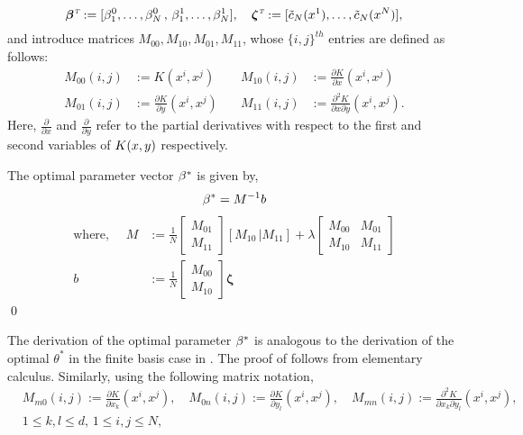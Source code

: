 \[
\boldsymbol{\beta}^{\hbox{\tiny\it T}}   := [\beta_1^0 ,\dots,  \beta_N^0 \,,\, \beta_1^1 ,\dots,  \beta_N^1],  \quad  \boldsymbol{\zeta}^{\hbox{\tiny\it T}}  := [\tilde c_N(x^1) ,\dots, \tilde c_N(x^N)],
\]
and introduce matrices $M_{00}, M_{10}, M_{01}, M_{11}$,  whose   $\{i,j\}^{th}$ entries are defined as follows:
\[
\begin{aligned}
M_{00}(i,j) &:= K(x^i,x^j)
\quad
& M_{10}(i,j) &:= \frac{\partial K}{\partial x}(x^i,x^j)
\\
M_{01}(i,j) &:= \frac{\partial K}{\partial y}(x^i,x^j)
\quad
& M_{11}(i,j) &:= \frac{\partial^2 K}{\partial x \partial y}(x^i,x^j).
\end{aligned}
\]	
Here, $\frac{\partial }{\partial x}$ and $\frac{\partial}{\partial y}$ refer to the partial derivatives with respect to the first and second variables of $K(x,y)$ respectively.
\begin{proposition}
	\label{prop:beta_star}
	The optimal parameter vector $\beta^*$ is given by,
	\begin{equation}
	\rkhsparam^* = M^{-1} b
	\label{e:rkhs_beta_2N}
	\end{equation}
	\begin{equation*}
	\begin{aligned}
	\text{where,
	}
	\quad
	M & := \frac{1}{N} \left[\begin{array}{c} M_{01}\\ \hline M_{11} \end{array}\right] [ M_{10} \,| M_{11}] + \lambda  \left[
	\begin{array}{c|c}
	M_{00} & M_{01} \\
	\hline
	M_{10} & M_{11}
	\end{array}
	\right] \\
	b & :=  \frac{1}{N} \left[ \begin{array}{c} M_{00} \\ \hline M_{10} \end{array}\right] \boldsymbol{\zeta}
	\end{aligned}
	\label{e:rkhs_beta_optimal}
	\end{equation*}
	\qed
\end{proposition}
The derivation of the optimal parameter $\beta^*$ is analogous to the derivation of the optimal $\theta^*$ in the finite basis case in . The proof of  follows from elementary calculus. 
Similarly, using the following matrix notation, 
\[
\begin{aligned}
& M_{m0}(i,j) := \frac{\partial K}{\partial x_k}(x^i,x^j),
\quad 
M_{0n}(i,j) := \frac{\partial K}{\partial y_l}(x^i,x^j),
\quad
M_{mn}(i,j) := \frac{\partial^2 K}{\partial x_k \partial y_l}(x^i,x^j), \\
& 1 \leq k,l \leq d, \, 1 \leq i,j \leq N,
\end{aligned}
\]	 
